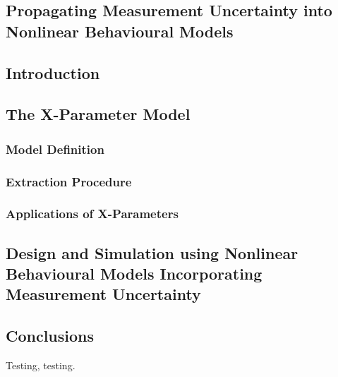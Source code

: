 \documentclass[../thesis/thesis.tex]{subfiles}
\begin{document}
\begin{refsection}
\chapter{Propagating Measurement Uncertainty into Nonlinear Behavioural Models}
\section{Introduction}
\section{The X-Parameter Model}
\subsection{Model Definition}
\subsection{Extraction Procedure}
\subsection{Applications of X-Parameters}
\section{Design and Simulation using Nonlinear Behavioural Models Incorporating Measurement Uncertainty}
\section{Conclusions}
Testing, testing\cite{Stant_2016_Coll, Stant_2016}.
\printbibliography
\end{refsection}
\end{document}
